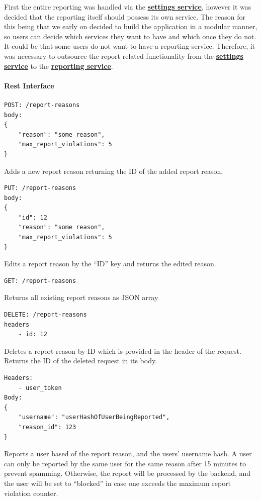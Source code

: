 First the entire reporting was handled via the \hyperref[subsubsec:settingsSer]{\textbf{settings service}}, however it
was decided that the reporting itself should possess its own service.
The reason for this being that we early on decided to build the application in a modular manner, so users can decide
which services they want to have and which once they do not.
It could be that some users do not want to have a reporting service.
Therefore, it was necessary to outsource the report related functionality from the
\hyperref[subsubsec:settingsSer]{\textbf{settings service}} to the
\hyperref[subsubsec:reportingSer]{\textbf{reporting service}}.

\paragraph{Rest Interface}
\begin{lstlisting}[label={lst:lstlisting7}]
POST: /report-reasons
body:
{
    "reason": "some reason",
    "max_report_violations": 5
}
\end{lstlisting}

Adds a new report reason returning the ID of the added report reason.

\begin{lstlisting}[label={lst:lstlisting8}]
PUT: /report-reasons
body:
{
    "id": 12
    "reason": "some reason",
    "max_report_violations": 5
}
\end{lstlisting}

Edits a report reason by the \enquote{ID} key and returns the edited reason.

\begin{lstlisting}[label={lst:lstlisting9}]
GET: /report-reasons
\end{lstlisting}

Returns all existing report reasons as JSON array

\begin{lstlisting}[label={lst:lstlisting10}]
DELETE: /report-reasons
headers
    - id: 12
\end{lstlisting}

Deletes a report reason by ID which is provided in the header of the request.
Returns the ID of the deleted request in its body.

\begin{lstlisting}[label={lst:lstlisting11}]
Headers:
    - user_token
Body:
{
    "username": "userHashOfUserBeingReported",
    "reason_id": 123
}
\end{lstlisting}

Reports a user based of the report reason, and the users' username hash.
A user can only be reported by the same user for the same reason after 15 minutes to prevent spamming.
Otherwise, the report will be processed by the backend, and the user will be set to \enquote{blocked} in case one
exceeds the maximum report violation counter.

